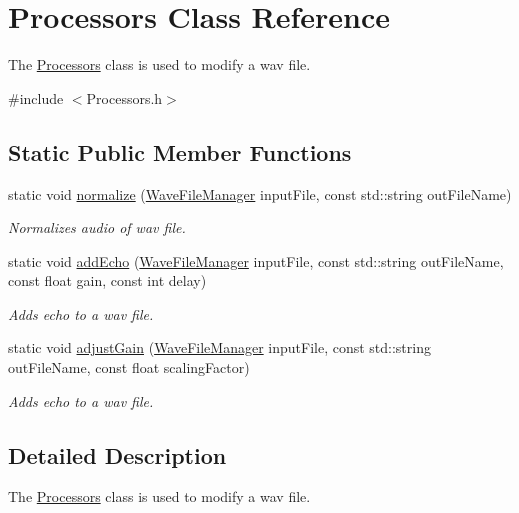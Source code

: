 \hypertarget{classProcessors}{}\section{Processors Class Reference}
\label{classProcessors}


The \hyperlink{classProcessors}{Processors} class is used to modify a wav file.  




{\ttfamily \#include $<$Processors.\+h$>$}

\subsection*{Static Public Member Functions}
\begin{DoxyCompactItemize}
\item 
static void \hyperlink{classProcessors_ae9eab62163738617ef294db9a2333a98}{normalize} (\hyperlink{classWaveFileManager}{Wave\+File\+Manager} input\+File, const std\+::string out\+File\+Name)
\begin{DoxyCompactList}\small\item\em Normalizes audio of wav file. \end{DoxyCompactList}\item 
static void \hyperlink{classProcessors_afb0d287e5063d3a9d9d831d65f65fb90}{add\+Echo} (\hyperlink{classWaveFileManager}{Wave\+File\+Manager} input\+File, const std\+::string out\+File\+Name, const float gain, const int delay)
\begin{DoxyCompactList}\small\item\em Adds echo to a wav file. \end{DoxyCompactList}\item 
static void \hyperlink{classProcessors_a25d4b6ea1877cf06ec2dac421180e3ff}{adjust\+Gain} (\hyperlink{classWaveFileManager}{Wave\+File\+Manager} input\+File, const std\+::string out\+File\+Name, const float scaling\+Factor)
\begin{DoxyCompactList}\small\item\em Adds echo to a wav file. \end{DoxyCompactList}\end{DoxyCompactItemize}


\subsection{Detailed Description}
The \hyperlink{classProcessors}{Processors} class is used to modify a wav file. 

